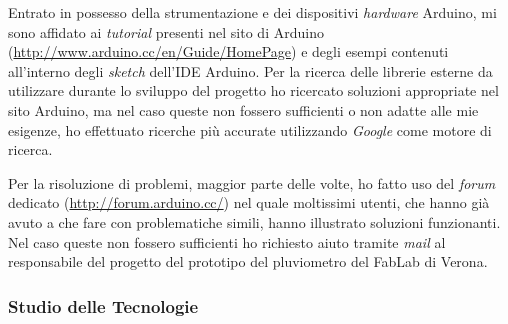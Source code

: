Entrato in possesso della strumentazione e dei dispositivi \textit{hardware} Arduino, mi sono affidato ai \textit{tutorial} presenti nel sito di Arduino (\url{http://www.arduino.cc/en/Guide/HomePage}) e degli esempi contenuti all'interno degli \textit{sketch} dell'IDE Arduino.
Per la ricerca delle librerie esterne da utilizzare durante lo sviluppo del progetto ho ricercato soluzioni appropriate nel sito Arduino, ma nel caso queste non fossero sufficienti o non adatte alle mie esigenze, ho effettuato ricerche più accurate utilizzando \textit{Google} come motore di ricerca.

Per la risoluzione di problemi, maggior parte delle volte, ho fatto uso del \textit{forum} dedicato (\url{http://forum.arduino.cc/}) nel quale moltissimi utenti, che hanno già avuto a che fare con problematiche simili, hanno illustrato soluzioni funzionanti. Nel caso queste non fossero sufficienti ho richiesto aiuto tramite \textit{mail} al responsabile del progetto del prototipo del pluviometro del FabLab di Verona.



\subsubsection{Studio delle Tecnologie}


